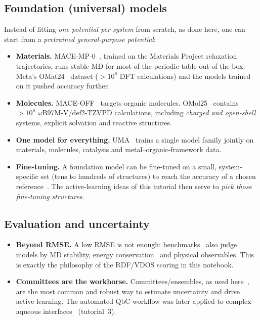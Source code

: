 \documentclass[11pt,a4paper]{article}
\begin{document}
\subsection{Foundation (universal) models}
Instead of fitting \emph{one potential per system} from scratch, as done
here, one can start from a \emph{pretrained general-purpose potential}:
\begin{itemize}
  \item \textbf{Materials.} MACE-MP-0~\cite{Batatia2023}, trained on the
        Materials Project relaxation trajectories, runs stable MD for most of
        the periodic table out of the box. Meta's OMat24~\cite{BarrosoLuque2024}
        dataset ($>10^8$ DFT calculations) and the models trained on it pushed
        accuracy further.
  \item \textbf{Molecules.} MACE-OFF~\cite{Kovacs2023} targets organic
        molecules. OMol25~\cite{Levine2025} contains $>10^8$
        $\omega$B97M-V/def2-TZVPD calculations, including \emph{charged and
        open-shell} systems, explicit solvation and reactive structures.
  \item \textbf{One model for everything.} UMA~\cite{Wood2025} trains a single
        model family jointly on materials, molecules, catalysis and
        metal--organic-framework data.
  \item \textbf{Fine-tuning.} A foundation model can be fine-tuned on a small,
        system-specific set (tens to hundreds of structures) to reach the
        accuracy of a chosen reference~\cite{Batatia2023}. The active-learning
        ideas of this tutorial then serve to \emph{pick those
        fine-tuning structures}.
\end{itemize}

\subsection{Evaluation and uncertainty}
\begin{itemize}
  \item \textbf{Beyond RMSE.} A low RMSE is not enough: benchmarks~\cite{Fu2022}
        also judge models by MD stability, energy conservation~\cite{Fu2025} and
        physical observables. This is exactly the philosophy of the RDF/VDOS
        scoring in this notebook.
  \item \textbf{Committees are the workhorse.} Committees/ensembles, as used
        here~\cite{Schran2020}, are the most common and robust way to
        estimate uncertainty and drive active learning. The automated QbC
        workflow was later applied to complex aqueous
        interfaces~\cite{Schran2021} (tutorial~3).
\end{itemize}
\end{document}
